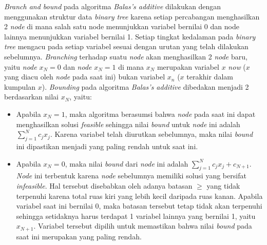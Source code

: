 \textit{Branch and bound} pada algoritma \textit{Balas's additive} dilakukan dengan menggunakan struktur data \textit{binary tree} karena setiap percabangan menghasilkan 2 \textit{node} di mana salah satu node menunjukkan variabel bernilai 0 dan node lainnya menunjukkan variabel bernilai 1. Setiap tingkat kedalaman pada \textit{binary tree} mengacu pada setiap variabel sesuai dengan urutan yang telah dilakukan sebelumnya. \textit{Branching} terhadap suatu \textit{node} akan menghasilkan 2 \textit{node} baru, yaitu \textit{node} \(x_N=0\) dan \textit{node} \(x_N=1\) di mana \(x_N\) merupakan variabel \(x\) \textit{now} (\(x\) yang diacu oleh \textit{node} pada saat ini) bukan variabel \(x_n\) (\(x\) terakhir dalam kumpulan \(x\)). \textit{Bounding} pada algoritma \textit{Balas's additive} dibedakan menjadi 2 berdasarkan nilai \(x_N\), yaitu:

\begin{itemize}
	\item Apabila \(x_N = 1\), maka algoritma berasumsi bahwa \textit{node} pada saat ini dapat menghasilkan solusi \textit{feasible} sehingga nilai \textit{bound} untuk \textit{node} ini adalah \(\sum_{j=1}^{N} c_j x_j\). Karena variabel telah diurutkan sebelumnya, maka nilai \textit{bound} ini dipastikan menjadi yang paling rendah untuk saat ini.
	
	\item Apabila \(x_N = 0\), maka nilai \textit{bound} dari \textit{node} ini adalah \(\sum_{j=1}^{N} c_j x_j + c_{N+1}\). \textit{Node} ini terbentuk karena \textit{node} sebelumnya memiliki solusi yang bersifat \textit{infeasible}. Hal tersebut disebabkan oleh adanya batasan \(\geq\) yang tidak terpenuhi karena total ruas kiri yang lebih kecil daripada ruas kanan. Apabila variabel saat ini bernilai 0, maka batasan tersebut tetap tidak akan terpenuhi sehingga setidaknya harus terdapat 1 variabel lainnya yang bernilai 1, yaitu \(x_{N+1}\). Variabel tersebut dipilih untuk memastikan bahwa nilai \textit{bound} pada saat ini merupakan yang paling rendah.
\end{itemize}

